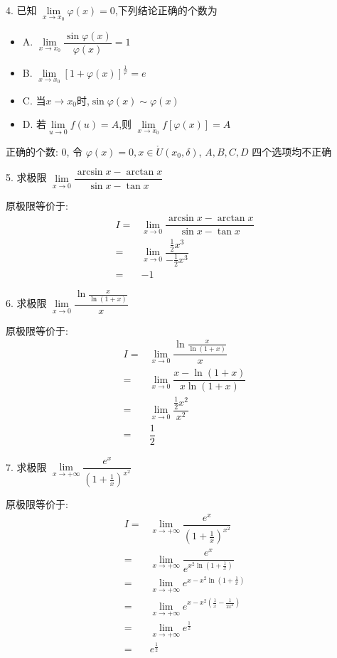 4. 已知 $\lim\limits_{x\to x_{0}}\varphi(x)=0$,下列结论正确的个数为
\begin{itemize}
	\item A. $\lim\limits_{x\to x_{0}}\dfrac{\sin\varphi(x)}{\varphi(x)}=1$
	\item B. $\lim\limits_{x\to x_{0}}[1+\varphi(x)]^{\frac{1}{\varphi}}=e$
	\item C. 当$x\to x_{0}$时,$\sin \varphi(x)\sim \varphi(x)$
	\item D. 若$\lim\limits_{u\to 0}f(u)=A$,则 $\lim\limits_{x\to x_{0}}f[\varphi(x)]=A$
\end{itemize}
\begin{solution}

	正确的个数: $0$, 令 $\varphi(x) = 0,x\in \mathring{U}(x_{0},\delta)$, $A,B,C,D$ 四个选项均不正确
\end{solution}

5. 求极限 $\lim\limits_{x\to 0}\dfrac{\arcsin x-\arctan x}{\sin x-\tan x}$
\begin{solution}
	原极限等价于:
	\begin{align*}
		I = & \lim\limits_{x\to 0}\dfrac{\arcsin x-\arctan x}{\sin x-\tan x}\\
		  = & \lim\limits_{x\to 0}\dfrac{\frac{1}{2}x^{3}}{-\frac{1}{2}x^{3}}\\
		  = & -1 
	\end{align*}
\end{solution}

6. 求极限 $\lim\limits_{x\to 0}\dfrac{\ln\frac{x}{\ln(1+x)}}{x}$
\begin{solution}

	原极限等价于:
	\begin{align*}
		I = & \lim\limits_{x\to 0}\dfrac{\ln\frac{x}{\ln(1+x)}}{x}\\
		  = & \lim\limits_{x\to 0}\dfrac{x-\ln(1+x)}{x\ln (1+x)}\\
		  = & \lim\limits_{x\to 0}\dfrac{\frac{1}{2}x^{2}}{x^{2}}\\
		  = & \dfrac{1}{2}
	\end{align*}
\end{solution}

7. 求极限 $\lim\limits_{x\to +\infty}\dfrac{e^{x}}{(1+\frac{1}{x})^{x^{2}}}$
\begin{solution}
	
	原极限等价于:
	\begin{align*}
		I = & \lim\limits_{x\to +\infty}\dfrac{e^{x}}{(1+\frac{1}{x})^{x^{2}}}\\
		  = & \lim\limits_{x\to +\infty}\dfrac{e^{x}}{e^{x^{2}\ln(1+\frac{1}{x})}}\\
		  = & \lim\limits_{x\to +\infty}e^{x-x^{2}\ln(1+\frac{1}{x})}\\
		  = & \lim\limits_{x\to +\infty}e^{x-x^{2}(\frac{1}{x}-\frac{1}{2x^{2}})}\\
		  = & \lim\limits_{x\to +\infty}e^{\frac{1}{2}}\\
		  = & e^{\frac{1}{2}}
	\end{align*}
\end{solution}

